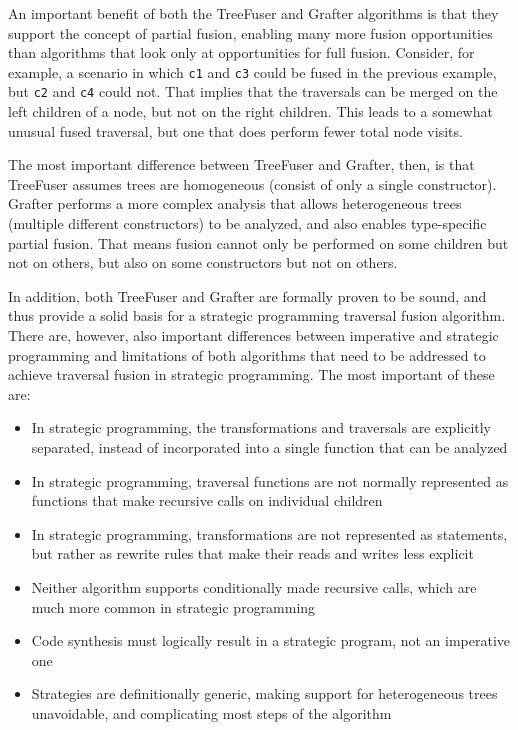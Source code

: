 An important benefit of both the TreeFuser and Grafter algorithms is that they support the concept of partial fusion, enabling many more fusion opportunities than algorithms that look only at opportunities for full fusion. Consider, for example, a scenario in which \texttt{c1} and \texttt{c3} could be fused in the previous example, but \texttt{c2} and \texttt{c4} could not. That implies that the traversals can be merged on the left children of a node, but not on the right children. This leads to a somewhat unusual fused traversal, but one that does perform fewer total node visits.

The most important difference between TreeFuser and Grafter, then, is that TreeFuser assumes trees are homogeneous (consist of only a single constructor). Grafter performs a more complex analysis that allows heterogeneous trees (multiple different constructors) to be analyzed, and also enables type-specific partial fusion. That means fusion cannot only be performed on some children but not on others, but also on some constructors but not on others. 

In addition, both TreeFuser and Grafter are formally proven to be sound, and thus provide a solid basis for a strategic programming traversal fusion algorithm. There are, however, also important differences between imperative and strategic programming and limitations of both algorithms that need to be addressed to achieve traversal fusion in strategic programming. The most important of these are:

\begin{itemize}
    \item In strategic programming, the transformations and traversals are explicitly separated, instead of incorporated into a single function that can be analyzed
    \item In strategic programming, traversal functions are not normally represented as functions that make recursive calls on individual children
    \item In strategic programming, transformations are not represented as statements, but rather as rewrite rules that make their reads and writes less explicit
    \item Neither algorithm supports conditionally made recursive calls, which are much more common in strategic programming
    \item Code synthesis must logically result in a strategic program, not an imperative one
    \item Strategies are definitionally generic, making support for heterogeneous trees unavoidable, and complicating most steps of the algorithm
\end{itemize}

